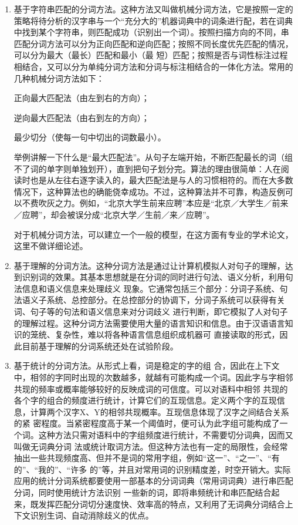 \documentclass[bachelor,winfonts]{jnuthesis}
\begin{document}
\begin{enumerate}
\item 基于字符串匹配的分词方法。这种方法又叫做机械分词方法，它是按照一定的策略将待分析的汉字串与一个“充分大的”机器词典中的词条进行配，若在词典中找到某个字符串，则匹配成功（识别出一个词）。按照扫描方向的不同，串匹配分词方法可以分为正向匹配和逆向匹配；按照不同长度优先匹配的情况，可以分为最大（最长）匹配和最小（最 短）匹配；按照是否与词性标注过程相结合，又可以分为单纯分词方法和分词与标注相结合的一体化方法。常用的几种机械分词方法如下：

正向最大匹配法（由左到右的方向）；

逆向最大匹配法（由右到左的方向）；

最少切分（使每一句中切出的词数最小）。

举例讲解一下什么是“最大匹配法”。从句子左端开始，不断匹配最长的词（组不了词的单字则单独划开），直到把句子划分完。算法的理由很简单：人在阅读时也是从左往右逐字读入的，最大匹配法是与人的习惯相符的。而在大多数情况下，这种算法也的确能侥幸成功。不过，这种算法并不可靠，构造反例可以不费吹灰之力。例如，“北京大学生前来应聘”本应是“北京／大学生／前来／应聘”，却会被误分成“北京大学／生前／来／应聘”。

对于机械分词方法，可以建立一个一般的模型，在这方面有专业的学术论文，这里不做详细论述。


\item 基于理解的分词方法。这种分词方法是通过让计算机模拟人对句子的理解，达到识别词的效果。其基本思想就是在分词的同时进行句法、语义分析，利用句法信息和语义信息来处理歧义 现象。它通常包括三个部分：分词子系统、句法语义子系统、总控部分。在总控部分的协调下，分词子系统可以获得有关词、句子等的句法和语义信息来对分词歧义 进行判断，即它模拟了人对句子的理解过程。这种分词方法需要使用大量的语言知识和信息。由于汉语语言知识的笼统、复杂性，难以将各种语言信息组织成机器可 直接读取的形式，因此目前基于理解的分词系统还处在试验阶段。

\item 基于统计的分词方法。从形式上看，词是稳定的字的组 合，因此在上下文中，相邻的字同时出现的次数越多，就越有可能构成一个词。因此字与字相邻共现的频率或概率能够较好的反映成词的可信度。可以对语料中相邻 共现的各个字的组合的频度进行统计，计算它们的互现信息。定义两个字的互现信息，计算两个汉字X、Y的相邻共现概率。互现信息体现了汉字之间结合关系的紧 密程度。当紧密程度高于某一个阈值时，便可认为此字组可能构成了一个词。这种方法只需对语料中的字组频度进行统计，不需要切分词典，因而又叫做无词典分词 法或统计取词方法。但这种方法也有一定的局限性，会经常抽出一些共现频度高、但并不是词的常用字组，例如“这一”、“之一”、“有的”、“我的”、“许多 的”等，并且对常用词的识别精度差，时空开销大。实际应用的统计分词系统都要使用一部基本的分词词典（常用词词典）进行串匹配分词，同时使用统计方法识别 一些新的词，即将串频统计和串匹配结合起来，既发挥匹配分词切分速度快、效率高的特点，又利用了无词典分词结合上下文识别生词、自动消除歧义的优点。
\end{enumerate}
\end{document}
